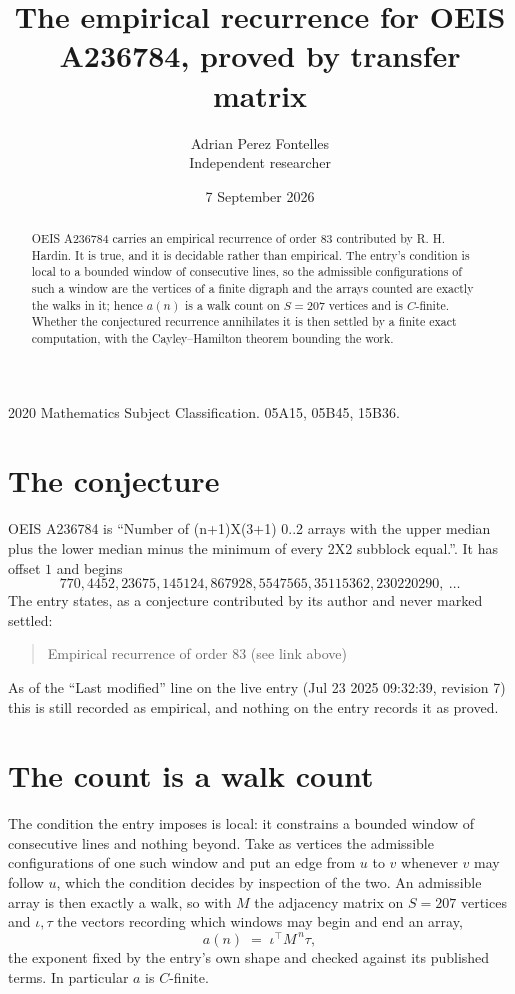 \documentclass[11pt,a4paper]{article}
\title{The empirical recurrence for OEIS A236784, proved by transfer matrix}
\author{Adrian Perez Fontelles\\ \small Independent researcher}
\date{7 September 2026}
\theoremstyle{plain}
\theoremstyle{definition}
\begin{document}
\maketitle

\begin{abstract}
OEIS A236784 carries an empirical recurrence of order $83$ contributed by R. H. Hardin. It is
true, and it is decidable rather than empirical. The entry's condition is local to a bounded window of consecutive lines, so
the admissible configurations of such a window are the vertices of a finite digraph and the
arrays counted are exactly the walks in it; hence $a(n)$ is a walk count on $S=207$ vertices
and is $C$-finite. Whether the conjectured recurrence annihilates it is then settled by a
finite exact computation, with the Cayley--Hamilton theorem bounding the work.
\end{abstract}

\noindent\small 2020 Mathematics Subject Classification. 05A15, 05B45, 15B36.\normalsize

\section{The conjecture}

OEIS A236784 is ``Number of (n+1)X(3+1) 0..2 arrays with the upper median plus the lower median minus the minimum of every 2X2 subblock equal.''. It has offset $1$ and begins
\[
770, 4452, 23675, 145124, 867928, 5547565, 35115362, 230220290,\ \dots
\]
The entry states, as a conjecture contributed by its author and never marked settled:
\begin{quote}
Empirical recurrence of order 83 (see link above)
\end{quote}
As of the ``Last modified'' line on the live entry (Jul 23 2025 09:32:39, revision 7) this is still
recorded as empirical, and nothing on the entry records it as proved.

\section{The count is a walk count}

The condition the entry imposes is local: it constrains a bounded window of consecutive lines and nothing beyond. Take as
vertices the admissible configurations of one such window and put an edge from $u$ to $v$
whenever $v$ may follow $u$, which the condition decides by inspection of the two. An
admissible array is then exactly a walk, so with $M$ the adjacency matrix on $S=207$ vertices
and $\iota,\tau$ the vectors recording which windows may begin and end an array,
\[
a(n)\;=\;\iota^{\!\top}M^{\,n}\tau ,
\]
the exponent fixed by the entry's own shape and checked against its published terms. In
particular $a$ is $C$-finite.
\end{document}
